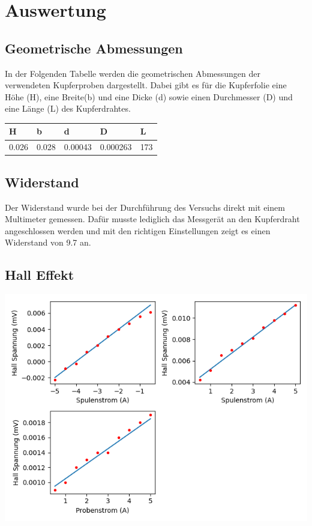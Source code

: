\documentclass[titlepage=firstcover, captions=tableheading]{scrartcl}
\begin{document}
\section{Auswertung}

\subsection{Geometrische Abmessungen}

In der Folgenden Tabelle werden die geometrischen Abmessungen der verwendeten Kupferproben dargestellt.
Dabei gibt es für die Kupferfolie eine Höhe (H), eine Breite(b) und eine Dicke (d) sowie einen Durchmesser (D) und eine Länge (L) des Kupferdrahtes.

\begin{center}
    \begin{tabular}{lllll}
        \toprule
        H & b & d & D & L \\
        \midrule 
        0.026 & 0.028 & 0.00043 & 0.000263 & 173 \\
        \bottomrule
    \end{tabular}
\end{center}

\subsection{Widerstand}

Der Widerstand wurde bei der Durchführung des Versuchs direkt mit einem Multimeter gemessen.
Dafür musste lediglich das Messgerät an den Kupferdraht angeschlossen werden und mit den richtigen Einstellungen zeigt es einen Widerstand von 9.7 \Omega \; an.

\subsection{Hall Effekt}

\includegraphics{plothall.png}
\end{document}
